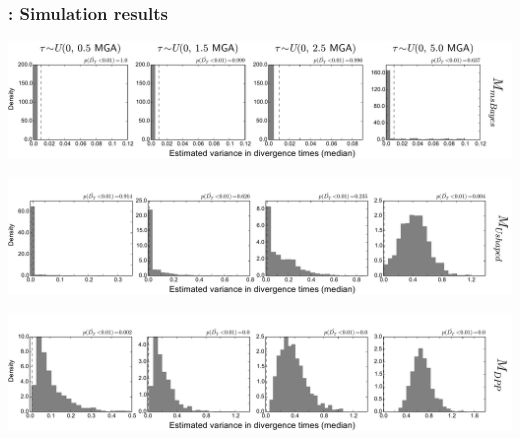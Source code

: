 \begin{frame}[noframenumbering]
    \frametitle{\dppmsbayes: Simulation results}
        \centerline{
        \includegraphics[width=\textwidth]{../images/old_old_power_omega_median.pdf}}
        \vspace{0mm}
        \centerline{
        \includegraphics[width=\textwidth]{../images/old_u-shaped_power_omega_median_headless.pdf}}
        \vspace{0mm}
        \centerline{
        \includegraphics[width=\textwidth]{../images/old_dpp_power_omega_median_headless.pdf}}
\end{frame}




